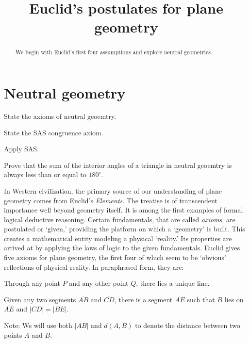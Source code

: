 \documentclass{ximera}
\title{Euclid's postulates for plane geometry} %
\begin{document}
\begin{abstract}
We begin with Euclid's first four assumptions and explore neutral
geometries.
\end{abstract}
\maketitle

\section{Neutral geometry}

\begin{listOutcomes}
\item State the axioms of neutral geoemtry.
\item State the SAS congruence axiom.
\item Apply SAS.
\item Prove that the sum of the interior angles of a triangle in
  neutral geoemtry is always less than or equal to $180^\circ$.
\end{listOutcomes}



In Western civilization, the primary source of our understanding of
plane geometry comes from Euclid's \textit{Elements}. The treatise is
of transcendent importance well beyond geometry itself. It is among
the first examples of formal logical deductive reasoning. Certain
fundamentals, that are called \textit{axioms}, are postulated or
`given,' providing the platform on which a `geometry' is built. This
creates a mathematical entity modeling a physical `reality.' Its
properties are arrived at by applying the laws of logic to the given
fundamentals. Euclid gives five axioms for plane geometry, the first
four of which seem to be `obvious' reflections of physical reality. In
paraphrased form, they are:

\begin{axiom}[E1]
Through any point $P$ and any other point $Q$, there lies a unique
line.
\end{axiom}

\begin{axiom}[E2] 
Given any two segments $\bar{AB}$ and $\bar{CD}$, there is a
segment $\bar{AE}$ such that $B$ lies on $\bar{AE}$ and
$\left\vert CD\right\vert =\left\vert BE\right\vert$.

Note: We will use both $\left\vert AB\right\vert$ and $d(A,B)$ to
denote the distance between two points $A$ and $B$.
\end{axiom}
\end{document}
